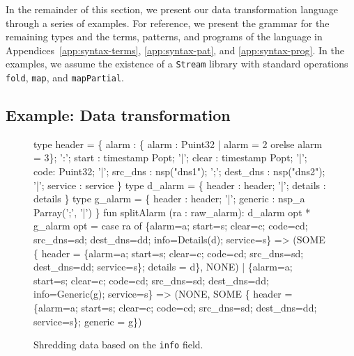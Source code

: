 In the remainder of this section, we present our data transformation
language through a series of examples.  For reference, we present the
grammar for the remaining types and the terms, patterns, and programs
of the language in Appendices~\ref{app:syntax-terms},
\ref{app:syntax-pat}, and \ref{app:syntax-prog}.  In the examples, we
assume the existence of a \texttt{Stream} library with standard
operations \texttt{fold}, \texttt{map}, and \texttt{mapPartial}.

\subsection{Example: Data transformation}
\begin{figure}
  \centering
  \begin{code}

type header = \{
       alarm : \{ alarm : Puint32 | alarm = 2 
                                    orelse alarm = 3\};
 ':';  start :  timestamp Popt;
 '|';  clear :  timestamp Popt;
 '|';  code: Puint32;
 '|';  src_dns  :  nsp("dns1");
 ';';  dest_dns :  nsp("dns2");
 '|';  service  : service
\}
  \mbox{}
type d_alarm = \{
       header   : header;
 '|';  details  : details
 \}
\mbox{}
type g_alarm = \{
       header   : header;
 '|';  generic  : nsp_a Parray(';', '|')
\}
\mbox{}
fun splitAlarm (ra : raw_alarm): d_alarm opt * g_alarm opt
  = case ra of
        \{alarm=a; start=s; clear=c; code=cd; src_dns=sd; 
         dest_dns=dd; info=Details(d); service=s\} 
        => 
        (SOME \{ header = \{alarm=a; start=s; clear=c; 
                          code=cd; src_dns=sd; 
                          dest_dns=dd; service=s\};
                details = d\}, 
         NONE)
      | \{alarm=a; start=s; clear=c; code=cd; src_dns=sd; 
         dest_dns=dd; info=Generic(g); service=s\} 
        => 
        (NONE,
         SOME \{ header = \{alarm=a; start=s; clear=c; 
                          code=cd; src_dns=sd; 
                          dest_dns=dd; service=s\};
                generic = g\})    
  \end{code}
  \caption{Shredding \darkstar{} data based on the {\tt info} field.}
  \label{fig:ex-no-err-check}
\end{figure}


